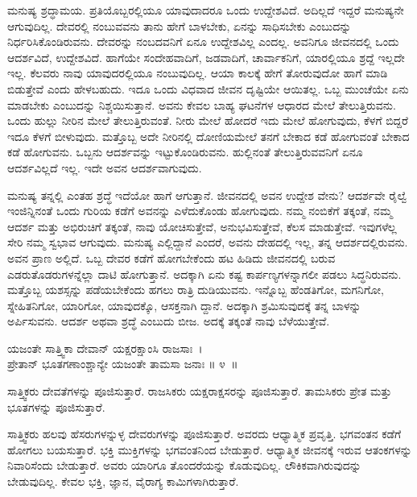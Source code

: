ಮನುಷ್ಯ ಶ್ರದ್ಧಾಮಯ. ಪ್ರತಿಯೊಬ್ಬರಲ್ಲಿಯೂ ಯಾವುದಾದರೂ ಒಂದು ಉದ್ದೇಶವಿದೆ. ಅದಿಲ್ಲದೆ ಇದ್ದರೆ ಮನುಷ್ಯನೇ ಆಗುವುದಿಲ್ಲ. ದೇವರಲ್ಲಿ ನಂಬುವವನು ತಾನು ಹೇಗೆ ಬಾಳಬೇಕು, ಏನನ್ನು ಸಾಧಿಸಬೇಕು ಎಂಬುದನ್ನು ನಿರ್ಧರಿಸಿಕೊಂಡಿರುವನು. ದೇವರನ್ನು ನಂಬದವನಿಗೆ ಏನೂ ಉದ್ದೇಶವಿಲ್ಲ ಎಂದಲ್ಲ. ಅವನಿಗೂ ಜೀವನದಲ್ಲಿ ಒಂದು ಆದರ್ಶವಿದೆ, ಉದ್ದೇಶವಿದೆ. ಹಾಗೆಯೇ ಸಂದೇಹವಾದಿಗೆ, ಜಡವಾದಿಗೆ, ಚಾರ್ವಾಕನಿಗೆ, ಯಾರಲ್ಲಿಯೂ ಶ್ರದ್ದೆ ಇಲ್ಲದೇ ಇಲ್ಲ. ಕೆಲವರು ನಾವು ಯಾವುದರಲ್ಲಿಯೂ ನಂಬುವುದಿಲ್ಲ. ಆಯಾ ಕಾಲಕ್ಕೆ ಹೇಗೆ ತೋರುವುದೋ ಹಾಗೆ ಮಾಡಿ ಬಿಡುತ್ತೇವೆ ಎಂದು ಹೇಳಬಹುದು. ಇದೂ ಒಂದು ವಿಧವಾದ ಜೀವನ ದೃಷ್ಟಿಯೇ ಆಯಿತಲ್ಲ. ಒಬ್ಬ ಮುಂಚೆಯೇ ಏನು ಮಾಡಬೇಕು ಎಂಬುದನ್ನು ನಿಶ್ಚಯಿಸುತ್ತಾನೆ. ಅವನು ಕೇವಲ ಬಾಹ್ಯ ಘಟನೆಗಳ ಆಧಾರದ ಮೇಲೆ ತೇಲುತ್ತಿರುವನು. ಒಂದು ಹುಲ್ಲು ನೀರಿನ ಮೇಲೆ ತೇಲುತ್ತಿರುವಂತೆ. ನೀರು ಮೇಲೆ ಹೋದರೆ ಇದು ಮೇಲೆ ಹೋಗುವುದು, ಕೆಳಗೆ ಬಿದ್ದರೆ ಇದೂ ಕೆಳಗೆ ಬೀಳುವುದು. ಮತ್ತೊಬ್ಬ ಅದೇ ನೀರಿನಲ್ಲಿ ದೋಣಿಯಮೇಲೆ ತನಗೆ ಬೇಕಾದ ಕಡೆ ಹೋಗುವಂತೆ ಬೇಕಾದ ಕಡೆ ಹೋಗುವನು. ಒಬ್ಬನು ಆದರ್ಶವನ್ನು ಇಟ್ಟುಕೊಂಡಿರುವನು. ಹುಲ್ಲಿನಂತೆ ತೇಲುತ್ತಿರುವವನಿಗೆ ಏನೂ ಆದರ್ಶವಿಲ್ಲದೆ ಇಲ್ಲ. ಇದೇ ಅವನ ಆದರ್ಶವಾಗುವುದು.

ಮನುಷ್ಯ ತನ್ನಲ್ಲಿ ಎಂತಹ ಶ್ರದ್ಧೆ ಇದೆಯೋ ಹಾಗೆ ಆಗುತ್ತಾನೆ. ಜೀವನದಲ್ಲಿ ಅವನ ಉದ್ದೇಶ ವೇನು? ಆದರ್ಶವೇ ರೈಲ್ವೆ ಇಂಜಿನ್ನಿನಂತೆ ಒಂದು ಗುರಿಯ ಕಡೆಗೆ ಅವನನ್ನು ಎಳೆದುಕೊಂಡು ಹೋಗುವುದು. ನಮ್ಮ ನಂಬಿಕೆಗೆ ತಕ್ಕಂತೆ, ನಮ್ಮ ಆದರ್ಶ ಮತ್ತು ಅಭಿರುಚಿಗೆ ತಕ್ಕಂತೆ, ನಾವು ಯೋಚಿಸುತ್ತೇವೆ, ಅನುಭವಿಸುತ್ತೇವೆ, ಕೆಲಸ ಮಾಡುತ್ತೇವೆ. ಇವುಗಳೆಲ್ಲ ಸೇರಿ ನಮ್ಮ ಸ್ವಭಾವ ಆಗುವುದು. ಮನುಷ್ಯ ಎಲ್ಲಿದ್ದಾನೆ ಎಂದರೆ, ಅವನು ದೇಹದಲ್ಲಿ ಇಲ್ಲ, ತನ್ನ ಆದರ್ಶದಲ್ಲಿರುವನು. ಅವನ ಪ್ರಾಣ ಅಲ್ಲಿದೆ. ಒಬ್ಬ ದೇವರ ಕಡೆಗೆ ಹೋಗಬೇಕೆಂದು ಹಟ ಹಿಡಿದು ಜೀವನದಲ್ಲಿ ಬರುವ ಎಡರುತೊಡರುಗಳನ್ನೆಲ್ಲಾ ದಾಟಿ ಹೋಗುತ್ತಾನೆ. ಅದಕ್ಕಾಗಿ ಏನು ಕಷ್ಟ ಕಾರ್ಪಣ್ಯಗಳನ್ನಾಗಲೀ ಪಡಲು ಸಿದ್ಧನಿರುವನು. ಮತ್ತೊಬ್ಬ ಯಶಸ್ಸನ್ನು ಪಡೆಯಬೇಕೆಂದು ಹಗಲು ರಾತ್ರಿ ದುಡಿಯುವನು. ಇನ್ನೊಬ್ಬ ಹೆಂಡತಿಗೋ, ಮಗನಿಗೋ, ಸ್ನೇಹಿತನಿಗೋ, ಯಾರಿಗೋ, ಯಾವುದಕ್ಕೊ, ಆಸಕ್ತನಾಗಿ ದ್ದಾನೆ. ಅದಕ್ಕಾಗಿ ಶ್ರಮಿಸುವುದಕ್ಕೆ ತನ್ನ ಬಾಳನ್ನು ಅರ್ಪಿಸುವನು. ಆದರ್ಶ ಅಥವಾ ಶ್ರದ್ಧೆ ಎಂಬುದು ಬೀಜ. ಅದಕ್ಕೆ ತಕ್ಕಂತೆ ನಾವು ಬೆಳೆಯುತ್ತೇವೆ.

\begin{shloka}
ಯಜಂತೇ ಸಾತ್ತ್ವಿಕಾ ದೇವಾನ್ ಯಕ್ಷರಕ್ಷಾಂಸಿ ರಾಜಸಾಃ~।\\ಪ್ರೇತಾನ್ ಭೂತಗಣಾಂಶ್ಚಾನ್ಯೇ ಯಜಂತೇ ತಾಮಸಾ ಜನಾಃ \hfill॥ ೪~॥
\end{shloka}

\begin{artha}
ಸಾತ್ತ್ವಿಕರು ದೇವತೆಗಳನ್ನು ಪೂಜಿಸುತ್ತಾರೆ. ರಾಜಸಿಕರು ಯಕ್ಷರಾಕ್ಷಸರನ್ನು ಪೂಜಿಸುತ್ತಾರೆ. ತಾಮಸಿಕರು ಪ್ರೇತ ಮತ್ತು ಭೂತಗಳನ್ನು ಪೂಜಿಸುತ್ತಾರೆ.
\end{artha}

ಸಾತ್ತ್ವಿಕರು ಹಲವು ಹೆಸರುಗಳನ್ನುಳ್ಳ ದೇವರುಗಳನ್ನು ಪೂಜಿಸುತ್ತಾರೆ. ಅವರದು ಆಧ್ಯಾತ್ಮಿಕ ಪ್ರವೃತ್ತಿ. ಭಗವಂತನ ಕಡೆಗೆ ಹೋಗಲು ಬಯಸುತ್ತಾರೆ. ಭಕ್ತಿ ಮುಕ್ತಿಗಳನ್ನು ಭಗವಂತನಿಂದ ಬೇಡುತ್ತಾರೆ. ಆಧ್ಯಾತ್ಮಿಕ ಜೀವನಕ್ಕೆ ಇರುವ ಆತಂಕಗಳನ್ನು ನಿವಾರಿಸೆಂದು ಬೇಡುತ್ತಾರೆ. ಅವರು ಯಾರಿಗೂ ತೊಂದರೆಯನ್ನು ಕೊಡುವುದಿಲ್ಲ. ಲೌಕಿಕವಾಗಿರುವುದನ್ನು ಬೇಡುವುದಿಲ್ಲ. ಕೇವಲ ಭಕ್ತಿ, ಜ್ಞಾನ, ವೈರಾಗ್ಯ ಕಾಮಿಗಳಾಗಿರುತ್ತಾರೆ.


